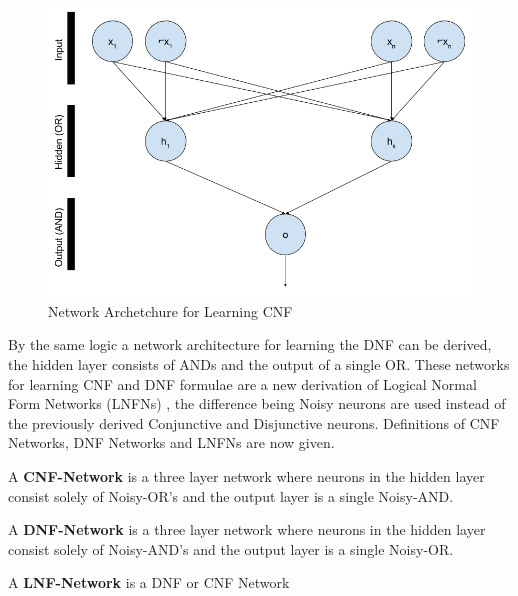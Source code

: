 \begin{figure}[H]
	\centering
	\begin{minipage}[b]{0.6\textwidth}
		\includegraphics[width=\textwidth]{CNF-Network-Structure.png}
		\caption{Network Archetchure for Learning CNF}
		\label{fig:cnf-network-structure}
	\end{minipage}
	\hfill
\end{figure}

By the same logic a network architecture for learning the DNF can be derived, the hidden layer consists of ANDs and the output of a single OR. These networks for learning CNF and DNF formulae are a new derivation of Logical Normal Form Networks (LNFNs) \cite{herrmann1996backpropagation}, the difference being Noisy neurons are used instead of the previously derived Conjunctive and Disjunctive neurons. Definitions of CNF Networks, DNF Networks and LNFNs are now given.

\theoremstyle{definition}
\begin{definition} \label{def:cnf-network}
A \textbf{CNF-Network} is a three layer network where neurons in the hidden layer consist solely of Noisy-OR's and the output layer is a single Noisy-AND. 
\end{definition}

\theoremstyle{definition}
\begin{definition} \label{def:dnf-network}
A \textbf{DNF-Network} is a three layer network where neurons in the hidden layer consist solely of Noisy-AND's and the output layer is a single Noisy-OR. 
\end{definition}

\theoremstyle{definition}
\begin{definition} \label{def:lnfn}
A \textbf{LNF-Network} is a DNF or CNF Network
\end{definition}

